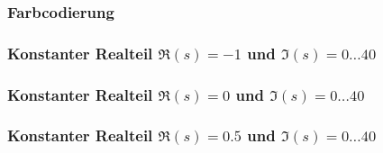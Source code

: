 \documentclass[ngerman, aspectratio=169]{beamer}
\begin{document}
    \begin{frame}
        \frametitle{Farbcodierung}
    \end{frame}

    \begin{frame}
        \frametitle{Konstanter Realteil $\Re(s)=-1$ und $\Im(s)=0\ldots40$}
    \end{frame}
    \begin{frame}
        \frametitle{Konstanter Realteil $\Re(s)=0$ und $\Im(s)=0\ldots40$}
    \end{frame}
    \begin{frame}
        \frametitle{Konstanter Realteil $\Re(s)=0.5$ und $\Im(s)=0\ldots40$}
    \end{frame}
\end{document}
